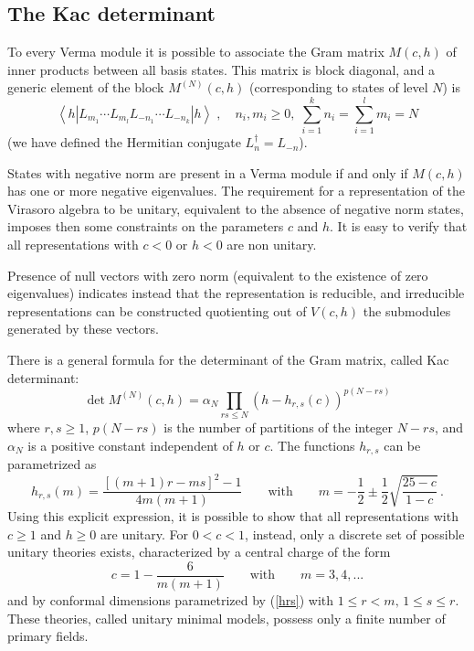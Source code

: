 \documentclass[a4paper,12pt]{report}
\begin{document}
\subsection{The Kac determinant}

To every Verma module it is possible to associate the Gram matrix $M(c,h)$ of inner products between all basis
states. This matrix is block diagonal, and a generic element of the block $M^{(N)}(c,h)$ (corresponding to states
of level $N$) is
\begin{equation}
\left\langle h |L_{m_{1}}\cdots L_{m_{l}}L_{-n_{1}}\cdots L_{-n_{k}}|h \right\rangle \;,\quad n_{i},m_{i}\geq
0,\;\sum_{i=1}^{k}n_{i}=\sum_{i=1}^{l}m_{i}=N
\end{equation}
(we have defined the Hermitian conjugate $L_{n}^{\dagger}=L_{-n}$).

States with negative norm are present in a Verma module if and only if $M(c,h)$ has one or more negative
eigenvalues. The requirement for a representation of the Virasoro algebra to be unitary, equivalent to the
absence of negative norm states, imposes then some constraints on the parameters $c$ and $h$. It is easy to
verify that all representations with $c<0$ or $h<0$ are non unitary.

Presence of null vectors with zero norm (equivalent to the existence of zero eigenvalues) indicates instead that
the representation is reducible, and irreducible representations can be constructed quotienting out of $V(c,h)$
the submodules generated by these vectors.

There is a general formula for the determinant of the Gram matrix, called Kac determinant:
\begin{equation}\label{Kdet}
\det M^{(N )}(c,h)=\alpha_{N }\prod_{rs\leq N }\left( h -h _{r,s}(c)\right) ^{p(N -rs)}
\end{equation}
where $r,s\geq 1$, $p(N -rs)$ is the number of partitions of the integer $N -rs$, and $\alpha_{N }$ is a positive
constant independent of $h$ or $c$. The functions $h _{r,s}$ can be parametrized as
\begin{equation}\label{hrs}
h_{r,s}(m)=\frac{\left[ (m+1)r-ms\right] ^{2}-1}{4m(m+1)}\qquad \textrm{with}\qquad m=-\frac{1}{2}\pm
\frac{1}{2}\sqrt{\frac{25-c}{1-c}} \,.
\end{equation}
Using this explicit expression, it is possible to show that all representations with $c\geq 1$ and $h\geq 0$ are
unitary. For $0<c<1$, instead, only a discrete set of possible unitary theories exists, characterized by a
central charge of the form
\begin{equation}\label{min}
c=1-\frac{6}{m(m+1)}\qquad \textrm{with}\qquad m=3,4,...
\end{equation}
and by conformal dimensions parametrized by (\ref{hrs}) with $1\leq r<m,\,1\leq s\leq r$. These theories, called
unitary minimal models, possess only a finite number of primary fields.
\end{document}

